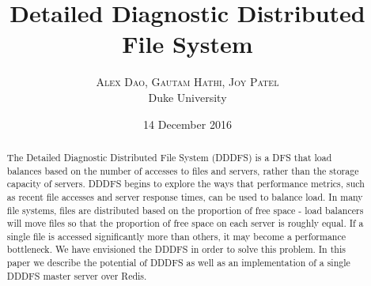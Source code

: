 \documentclass[twoside]{article}
\title{\vspace{-15mm}\fontsize{24pt}{10pt}\selectfont\textbf{Detailed Diagnostic Distributed File System}} %
\author{
\large
\textsc{Alex Dao, Gautam Hathi, Joy Patel}\\[2mm] %
\normalsize Duke University \\ %
\vspace{-5mm}
}
\date{14 December 2016}
\begin{document}
\maketitle %

\thispagestyle{fancy} %


\begin{abstract}

\noindent The Detailed Diagnostic Distributed File System (DDDFS) is a DFS that load balances based on the number of accesses to files and servers, rather than the storage capacity of servers. DDDFS begins to explore the ways that performance metrics, such as recent file accesses and server response times, can be used to balance load. In many file systems, files are distributed based on the proportion of free space - load balancers will move files so that the proportion of free space on each server is roughly equal. If a single file is accessed significantly more than others, it may become a performance bottleneck. We have envisioned the DDDFS in order to solve this problem. In this paper we describe the potential of DDDFS as well as an implementation of a single DDDFS master server over Redis.

\end{abstract}

\end{document}
